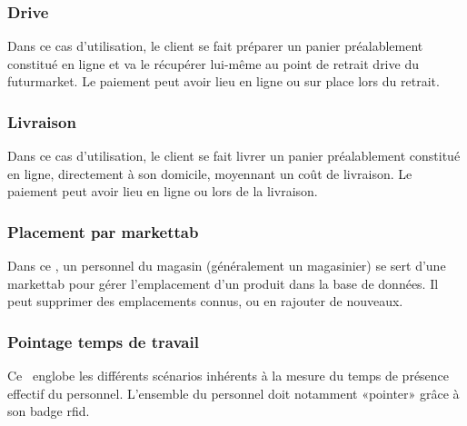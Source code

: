 \subsubsection{Drive}
Dans ce cas d'utilisation, le client se fait préparer un panier préalablement constitué en ligne et va le récupérer lui-même au point de retrait drive du futurmarket.
Le paiement peut avoir lieu en ligne ou sur place lors du retrait.

\subsubsection{Livraison}
Dans ce cas d'utilisation, le client se fait livrer un panier préalablement constitué en ligne, directement à son domicile, moyennant un coût de livraison.
Le paiement peut avoir lieu en ligne ou lors de la livraison.

\subsubsection{Placement par markettab}
Dans ce \cu, un personnel du magasin (généralement un magasinier) se sert d'une markettab pour gérer l'emplacement d'un produit dans la base de données.
Il peut supprimer des emplacements connus, ou en rajouter de nouveaux.

\subsubsection{Pointage temps de travail}
Ce \cu\ englobe les différents scénarios inhérents à la mesure du temps de présence effectif du personnel.
L'ensemble du personnel doit notamment «pointer» grâce à son badge rfid.
